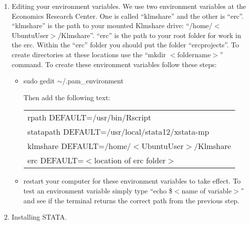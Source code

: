 \documentclass{article}
\begin{document}
\begin{enumerate}
\item Editing your environment variables. We use two environment variables at the Economics Research Center. One is called
``klmshare'' and the other is ``erc''. ``klmshare'' is the path to your mounted Klmshare drive: ``/home/$<$UbuntuUser$>$/Klmshare''. 
``erc'' is the path to your root folder for work in the erc. Within the ``erc'' folder you should put the folder ``ercprojects''. To create
directories at these locations use the ``mkdir $<$foldername$>$'' command. To create these environment variables follow these steps:

	\begin{itemize}
		\item sudo gedit $\sim$/.pam\_environment

		Then add the following text:
		\begin{tabular}{l}
			rpath DEFAULT=/usr/bin/Rscript \\
			statapath DEFAULT=/usr/local/stata12/xstata-mp \\
			klmshare DEFAULT=/home/$<$UbuntuUser$>$/Klmshare \\
			erc DEFAULT=$<$location of erc folder$>$ \\
		\end{tabular}

		\item restart your computer for these environment variables to take effect. To test
		an environment variable simply type ``echo \$$<$name of variable$>$'' and see if the terminal
		returns the correct path from the previous step. 
	\end{itemize}

\item Installing STATA. 


\end{enumerate}
\end{document}
